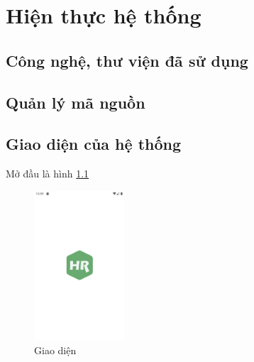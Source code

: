 \chapter{Hiện thực hệ thống} \label{chapter:system_implement}
\section{Công nghệ, thư viện đã sử dụng}

\section{Quản lý mã nguồn}
\section{Giao diện của hệ thống}
Mở đầu là hình \ref{fig:mobile_introduction}
\begin{figure}[H]
    \centering
    \includegraphics[width=0.3\textwidth,frame]{images/landing_page.png}
    \caption{Giao diện}
    \label{fig:mobile_introduction}
\end{figure}
